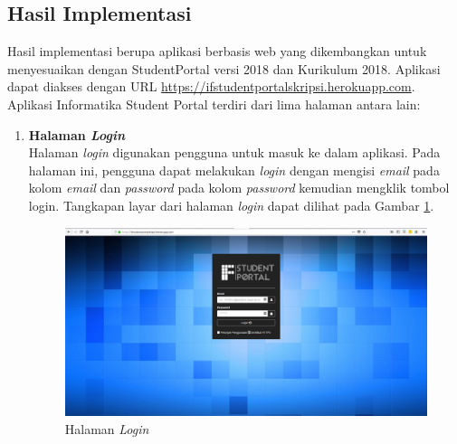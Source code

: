 \subsection{Hasil Implementasi}
		Hasil implementasi berupa aplikasi berbasis web yang dikembangkan untuk menyesuaikan dengan StudentPortal versi 2018 dan Kurikulum 2018. Aplikasi dapat diakses dengan URL \url{https://ifstudentportalskripsi.herokuapp.com}. Aplikasi Informatika Student Portal terdiri dari lima halaman antara lain:
		\begin{enumerate}
			\item\textbf{Halaman \textit{Login}}\\
				Halaman \textit{login} digunakan pengguna untuk masuk ke dalam aplikasi. Pada halaman ini, pengguna dapat melakukan \textit{login} dengan mengisi \textit{email} pada kolom \textit{email} dan \textit{password} pada kolom \textit{password} kemudian mengklik tombol login. Tangkapan layar dari halaman \textit{login} dapat dilihat pada Gambar \ref{fig:5_halaman_login}.
					\begin{figure}[H]
						\centering
						\includegraphics[scale=0.34]{Gambar/halaman_login}
						\caption{Halaman \textit{Login}} 
						\label{fig:5_halaman_login}
					\end{figure}
					

\end{enumerate}

